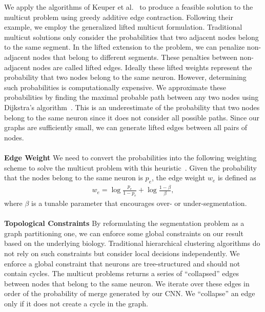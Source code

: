 We apply the algorithms of Keuper et al.~\cite{keuper2015efficient} to produce a feasible solution to the multicut problem using greedy additive edge contraction.
Following their example, we employ the generalized lifted multicut formulation.
Traditional multicut solutions only consider the probabilities that two adjacent nodes belong to the same segment. 
In the lifted extension to the problem, we can penalize non-adjacent nodes that belong to different segments. 
These penalties between non-adjacent nodes are called lifted edges. 
Ideally these lifted weights represent the probability that two nodes belong to the same neuron.
However, determining such probabilities is computationally expensive.
We approximate these probabilities by finding the maximal probable path between any two nodes using Dijkstra's algorithm~\cite{keuper2015efficient}.
This is an underestimate of the probability that two nodes belong to the same neuron since it does not consider all possible paths.
Since our graphs are sufficiently small, we can generate lifted edges between all pairs of nodes. 
\\~\\
\noindent\textbf{Edge Weight} 
We need to convert the probabilities into the following weighting scheme to solve the multicut problem with this heuristic~\cite{keuper2015efficient,andres2011probabilistic}.
Given the probability that the nodes belong to the same neuron is $p_e$, the edge weight $w_e$ is defined as
\begin{align}
w_e = \log{\frac{p_e}{1 - p_e}} + \log{\frac{1 - \beta}{\beta}},
\end{align}
where $\beta$ is a tunable parameter that encourages over- or under-segmentation. 
\\~\\
\noindent\textbf{Topological Constraints}
By reformulating the segmentation problem as a graph partitioning one, we can enforce some global constraints on our result based on the underlying biology.
Traditional hierarchical clustering algorithms do not rely on such constraints but consider local decisions independently.
We enforce a global constraint that neurons are tree-structured and should not contain cycles. 
The multicut problems returns a series of ``collapsed'' edges between nodes that belong to the same neuron.
We iterate over these edges in order of the probability of merge generated by our CNN. 
We ``collapse'' an edge only if it does not create a cycle in the graph.
